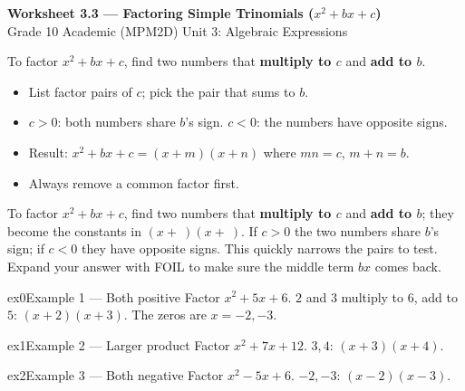 \documentclass[11pt]{article}
\begin{document}
\begin{center}
{\LARGE\bfseries\color{titleblue}Worksheet 3.3 --- Factoring Simple Trinomials ($x^2+bx+c$)}\\[2pt]
{\small Grade 10 Academic (MPM2D) \textperiodcentered{} Unit 3: Algebraic Expressions}
\end{center}

\begin{ideabox}
To factor $x^2+bx+c$, find two numbers that \textbf{multiply to $c$} and \textbf{add to $b$}.
\begin{itemize}[leftmargin=*,itemsep=2pt]
  \item List factor pairs of $c$; pick the pair that sums to $b$.
  \item $c>0$: both numbers share $b$'s sign. $c<0$: the numbers have opposite signs.
  \item Result: $x^2+bx+c=(x+m)(x+n)$ where $mn=c$, $m+n=b$.
  \item Always remove a common factor first.
\end{itemize}
\end{ideabox}

\begin{learnbox}
To factor $x^2+bx+c$, find two numbers that \textbf{multiply to $c$} and \textbf{add to $b$}; they become the constants in $(x+\ )(x+\ )$.
If $c>0$ the two numbers share $b$'s sign; if $c<0$ they have opposite signs. This quickly narrows the pairs to test.
Expand your answer with FOIL to make sure the middle term $bx$ comes back.
\end{learnbox}


\begin{example}{ex0}{Example 1 --- Both positive}
Factor $x^2+5x+6$.
\soln $2$ and $3$ multiply to $6$, add to $5$: $(x+2)(x+3)$. The zeros are $x=-2,-3$.
\end{example}

\begin{example}{ex1}{Example 2 --- Larger product}
Factor $x^2+7x+12$.
\soln $3,4$: $(x+3)(x+4).$
\end{example}

\begin{example}{ex2}{Example 3 --- Both negative}
Factor $x^2-5x+6$.
\soln $-2,-3$: $(x-2)(x-3).$
\end{example}
\end{document}
